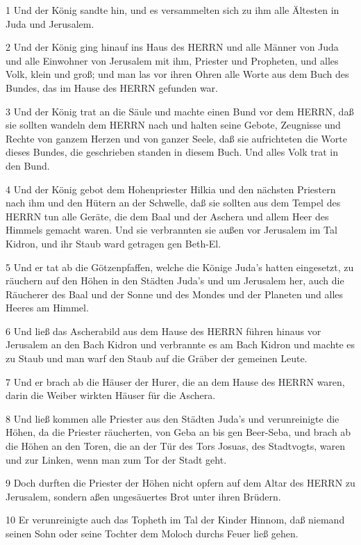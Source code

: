 \par 1 Und der König sandte hin, und es versammelten sich zu ihm alle Ältesten in Juda und Jerusalem.
\par 2 Und der König ging hinauf ins Haus des HERRN und alle Männer von Juda und alle Einwohner von Jerusalem mit ihm, Priester und Propheten, und alles Volk, klein und groß; und man las vor ihren Ohren alle Worte aus dem Buch des Bundes, das im Hause des HERRN gefunden war.
\par 3 Und der König trat an die Säule und machte einen Bund vor dem HERRN, daß sie sollten wandeln dem HERRN nach und halten seine Gebote, Zeugnisse und Rechte von ganzem Herzen und von ganzer Seele, daß sie aufrichteten die Worte dieses Bundes, die geschrieben standen in diesem Buch. Und alles Volk trat in den Bund.
\par 4 Und der König gebot dem Hohenpriester Hilkia und den nächsten Priestern nach ihm und den Hütern an der Schwelle, daß sie sollten aus dem Tempel des HERRN tun alle Geräte, die dem Baal und der Aschera und allem Heer des Himmels gemacht waren. Und sie verbrannten sie außen vor Jerusalem im Tal Kidron, und ihr Staub ward getragen gen Beth-El.
\par 5 Und er tat ab die Götzenpfaffen, welche die Könige Juda's hatten eingesetzt, zu räuchern auf den Höhen in den Städten Juda's und um Jerusalem her, auch die Räucherer des Baal und der Sonne und des Mondes und der Planeten und alles Heeres am Himmel.
\par 6 Und ließ das Ascherabild aus dem Hause des HERRN führen hinaus vor Jerusalem an den Bach Kidron und verbrannte es am Bach Kidron und machte es zu Staub und man warf den Staub auf die Gräber der gemeinen Leute.
\par 7 Und er brach ab die Häuser der Hurer, die an dem Hause des HERRN waren, darin die Weiber wirkten Häuser für die Aschera.
\par 8 Und ließ kommen alle Priester aus den Städten Juda's und verunreinigte die Höhen, da die Priester räucherten, von Geba an bis gen Beer-Seba, und brach ab die Höhen an den Toren, die an der Tür des Tors Josuas, des Stadtvogts, waren und zur Linken, wenn man zum Tor der Stadt geht.
\par 9 Doch durften die Priester der Höhen nicht opfern auf dem Altar des HERRN zu Jerusalem, sondern aßen ungesäuertes Brot unter ihren Brüdern.
\par 10 Er verunreinigte auch das Topheth im Tal der Kinder Hinnom, daß niemand seinen Sohn oder seine Tochter dem Moloch durchs Feuer ließ gehen.
